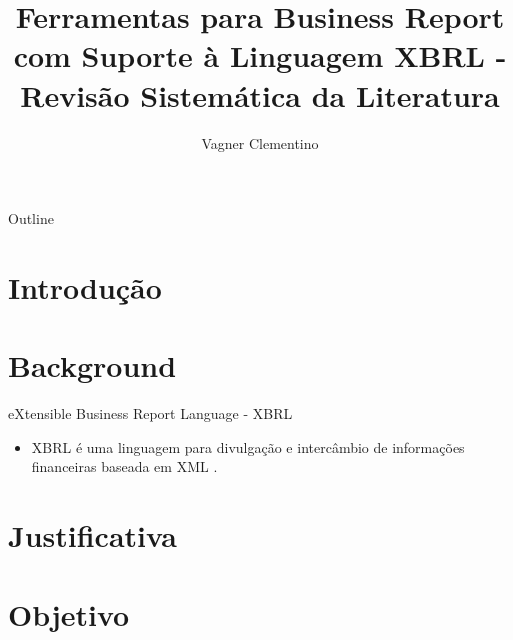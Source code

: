 \documentclass[t,14pt,mathserif]{beamer}
\title[] %
{Ferramentas para Business Report \\
com Suporte à Linguagem XBRL - \\
Revisão Sistemática da Literatura}
\subtitle
{Vagner Clementino}
\institute[] %
{
  Departamento de Ciência da Computação\\
  Universidade Federal de Minas Gerais (UFMG)\\
  Empirical Software Engineering - 2015\\
  }
\date[2015/12/16] %
\begin{document}
\begin{frame}
  \titlepage
\end{frame}

\begin{frame}{Outline}
  \tableofcontents
\end{frame}




\section{Introdução}
\section{Background}
\begin{frame}{eXtensible Business Report Language - XBRL}

    \begin{itemize}
      \item \alert{XBRL} é uma linguagem para divulgação e intercâmbio de
        informações financeiras baseada em XML \cite{xbrl_conceitos_aplicacoes}.
    \end{itemize}



\end{frame}

\section{Justificativa}
\section{Objetivo}
\end{document}
